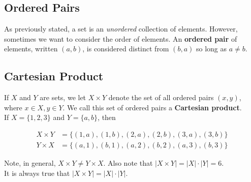 \clearpage

\subsection*{Ordered Pairs}

As previously stated, a set is an \textit{unordered} collection of elements.  However, sometimes we want to consider the order of elements.  An \textbf{ordered pair} of elements, written $(a, b)$, is considered distinct from $(b, a)$ so long as $a \neq b$.  

\subsection*{Cartesian Product}

If $X$ and $Y$ are sets, we let $X \times Y$ denote the set of all ordered pairs $(x, y)$, where $x \in X, y \in Y$.  We call this set of ordered pairs a \textbf{Cartesian product}.\\

If $X = \{1, 2, 3\}$ and $Y = \{a, b\}$, then

\begin{align*}
X \times Y &= \{(1, a), (1, b), (2, a), (2, b), (3, a), (3, b)\}\\
Y \times X &= \{(a, 1), (b, 1), (a, 2), (b, 2), (a, 3), (b, 3)\}
\end{align*}

Note, in general, $X \times Y \neq Y \times X$.  Also note that $|X \times Y| = |X| \cdot |Y| = 6$.\\
It is always true that $|X \times Y| = |X| \cdot |Y|$.




